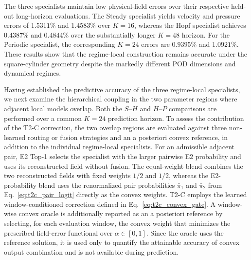 The three specialists maintain low physical-field errors over their
respective held-out long-horizon evaluations. The Steady specialist yields
velocity and pressure errors of $1.5311\%$ and $1.4583\%$ over $K=16$,
whereas the Hopf specialist achieves $0.4387\%$ and $0.4844\%$ over the
substantially longer $K=48$ horizon. For the Periodic specialist, the
corresponding $K=24$ errors are $0.9395\%$ and $1.0921\%$. These results
show that the regime-local construction remains accurate under the
square-cylinder geometry despite the markedly different POD dimensions and
dynamical regimes.


Having established the predictive accuracy of the three regime-local
specialists, we next examine the hierarchical coupling in the two parameter
regions where adjacent local models overlap. Both the $S$--$H$ and $H$--$P$
comparisons are performed over a common $K=24$ prediction horizon. To assess the contribution of the T2-C correction, the two overlap regions
are evaluated against three non-learned routing or fusion strategies and an
a posteriori convex reference, in addition to the individual regime-local
specialists. For an admissible adjacent pair, E2 Top-1 selects the specialist
with the larger pairwise E2 probability and uses its reconstructed field
without fusion. The equal-weight blend combines the two reconstructed fields
with fixed weights $1/2$ and $1/2$, whereas the E2-probability blend uses
the renormalized pair probabilities $\bar{\pi}_1$ and $\bar{\pi}_2$ from
Eq.~\eqref{eq:t2c_pair_logit} directly as the convex weights. T2-C employs
the learned window-conditioned correction defined in
Eq.~\eqref{eq:t2c_convex_gate}. A window-wise convex oracle is additionally
reported as an a posteriori reference by selecting, for each evaluation
window, the convex weight that minimizes the prescribed field-error
functional over $\alpha\in[0,1]$. Since the oracle uses the reference
solution, it is used only to quantify the attainable accuracy of convex
output combination and is not available during prediction.

